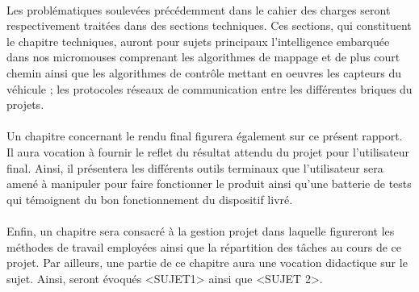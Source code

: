 \paragraph{}
{
Les problématiques soulevées précédemment dans le cahier des charges seront respectivement traitées dans des sections techniques. Ces sections, qui constituent le chapitre techniques, auront pour sujets principaux l'intelligence embarquée dans nos micromouses comprenant les algorithmes de mappage et de plus court chemin ainsi que les algorithmes de contrôle mettant en oeuvres les capteurs du véhicule ; les protocoles réseaux de communication entre les différentes briques du projets.
}

\paragraph{}
{
Un chapitre concernant le rendu final figurera également sur ce présent rapport. Il aura vocation à fournir le reflet du résultat attendu du projet pour l'utilisateur final. Ainsi, il présentera les différents outils terminaux que l'utilisateur sera amené à manipuler pour faire fonctionner le produit ainsi qu'une batterie de tests qui témoignent du bon fonctionnement du dispositif livré.
}

\paragraph{}
{
Enfin, un chapitre sera consacré à la gestion projet dans laquelle figureront les méthodes de travail employées ainsi que la répartition des tâches au cours de ce projet. Par ailleurs, une partie de ce chapitre aura une vocation didactique sur le sujet. Ainsi, seront évoqués <SUJET1> ainsi que <SUJET 2>.
}